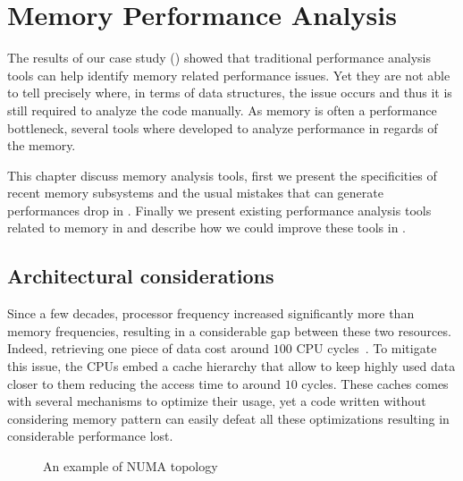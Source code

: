 \chapter{Memory Performance Analysis}

The results of our case study () showed that traditional performance analysis tools can help identify memory related performance issues.
Yet they are not able to tell precisely where, in terms of data structures, the issue occurs and thus it is still required to analyze the code manually.
As memory is often a performance bottleneck, several tools where developed to analyze performance in regards of the memory.

This chapter discuss memory analysis tools, first we present the specificities of recent memory subsystems and the usual mistakes that can generate performances drop in .
Finally we present existing performance analysis tools related to memory in  and describe how we could improve these tools in .

\section{Architectural considerations}
\label{sec:archi}

Since a few decades, processor frequency increased significantly more than memory frequencies, resulting in a considerable gap between these two resources.
Indeed, retrieving one piece of data cost around $100$ \gls{CPU} cycles~\cite{Drepper07What}.
To mitigate this issue, the \glspl{CPU} embed a cache hierarchy that allow to keep highly used data closer to them reducing the access time to around $10$ cycles.
These caches comes with several mechanisms to optimize their usage, yet a code written without considering memory pattern can easily defeat all these optimizations resulting in considerable performance lost.


\begin{figure}[htb]
    \centering
    
    \caption{An example of \gls{NUMA} topology}
    \label{fig:topo-NUMA}
\end{figure}

